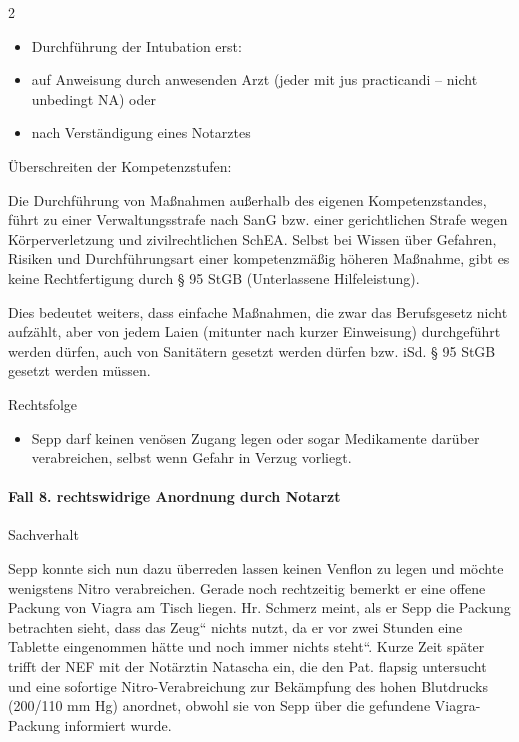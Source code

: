 \documentclass{article}
\begin{document}
\begin{multicols}{2}
\begin{itemize}
\item Durchf\"uhrung der Intubation erst:

\end{itemize}
\begin{itemize}
\item auf Anweisung durch anwesenden Arzt (jeder mit jus practicandi%
%
 -- nicht unbedingt NA) oder

\item nach Verst\"andigung eines Notarztes 

\end{itemize}
\"Uberschreiten der Kompetenzstufen:

Die Durchf\"uhrung von Ma{\ss}nahmen au{\ss}erhalb des eigenen
Kompetenzstandes, f\"uhrt zu einer Verwaltungsstrafe nach SanG bzw.
einer gerichtlichen Strafe wegen K\"orperverletzung und
zivilrechtlichen SchEA. Selbst bei Wissen \"uber Gefahren, Risiken und
Durchf\"uhrungsart einer kompetenzm\"a{\ss}ig h\"oheren Ma{\ss}nahme,
gibt es keine Rechtfertigung durch {\S} 95 StGB (Unterlassene
Hilfeleistung).

Dies bedeutet weiters, dass einfache Ma{\ss}nahmen, die zwar das
Berufsgesetz nicht aufz\"ahlt, aber von jedem Laien (mitunter nach
kurzer Einweisung) durchgef\"uhrt werden d\"urfen, auch von
Sanit\"atern gesetzt werden d\"urfen bzw. iSd. {\S} 95 StGB gesetzt
werden m\"ussen.

Rechtsfolge

\begin{itemize}
\item Sepp darf keinen ven\"osen Zugang legen oder sogar Medikamente
dar\"uber verabreichen, selbst  wenn Gefahr in Verzug vorliegt. 

\end{itemize}
\end{multicols}
\paragraph{Fall 8. rechtswidrige Anordnung durch Notarzt}
Sachverhalt

Sepp konnte sich nun dazu \"uberreden lassen keinen Venflon zu legen und
m\"ochte wenigstens Nitro verabreichen. Gerade noch rechtzeitig bemerkt
er eine offene Packung von Viagra am Tisch liegen. Hr. Schmerz meint,
als er Sepp die Packung betrachten sieht, dass das
{\quotedblbase}Zeug{\textquotedblleft} nichts nutzt, da er vor zwei
Stunden eine Tablette eingenommen h\"atte und noch immer
{\quotedblbase}nichts steht{\textquotedblleft}. Kurze Zeit sp\"ater
trifft der NEF mit der Not\"arztin Natascha ein, die den Pat. flapsig
untersucht und eine sofortige Nitro-Verabreichung zur Bek\"ampfung des
hohen Blutdrucks (200/110 mm Hg) anordnet, obwohl sie von Sepp \"uber
die gefundene Viagra-Packung informiert wurde.
\end{document}
